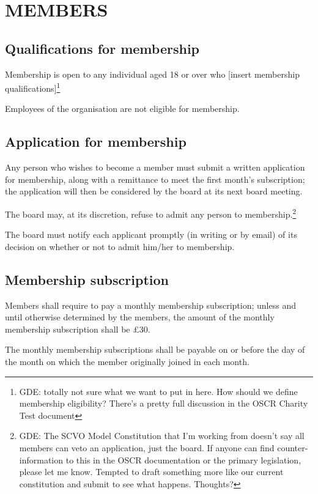 \documentclass{article}
\begin{document}
\section{MEMBERS}
\subsection{Qualifications for membership}
\clause Membership is open to any individual aged 18 or over who
[insert membership qualifications]\footnote{GDE: totally not sure what
  we want to put in here. How should we define membership
  eligibility? There's a pretty full discussion in the OSCR Charity
  Test document}

\clause Employees of the organisation are not eligible for membership.

\subsection{Application for membership}

\clause Any person who wishes to become a member must submit a written
application for membership, along with a remittance to meet the first
month's subscription; the application will then be considered by the
board at its next board meeting.  

\clause The board may, at its discretion, refuse to admit any person
to membership.\footnote{GDE: The SCVO Model Constitution that I'm
  working from doesn't say all members can veto an application, just
  the board. If anyone can find counter-information to this in the
  OSCR documentation or the primary legislation, please let me
  know. Tempted to draft something more like our current constitution
  and submit to see what happens. Thoughts?} 
 
\clause The board must notify each applicant promptly (in writing or
by email) of its decision on whether or not to admit him/her to
membership.

\subsection{Membership subscription}

\clause Members shall require to pay a monthly membership
subscription; unless and until otherwise determined by the members,
the amount of the monthly membership subscription shall be \pounds 30.

\clause The monthly membership subscriptions shall be payable on or
before the day of the month on which the member originally joined in
each month.
\end{document}
